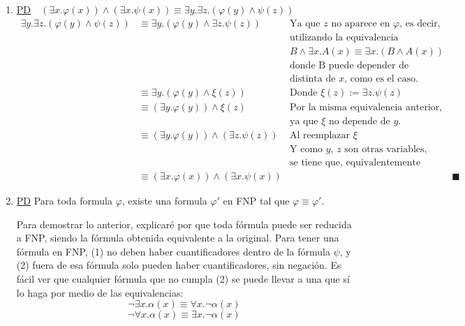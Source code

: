 \documentclass[letter]{article}
\begin{document}
	\begin{pregunta}{2}
		\begin{enumerate}
		\item
			\underline{PD}\ \ $(\exists x. \varphi(x)) \wedge (\exists x. \psi(x)) \equiv \exists y. \exists z. (\varphi(y) \wedge \psi(z))$
			\begin{align*}
				\exists y. \exists z. (\varphi(y) \wedge \psi(z))
				&\equiv \exists y. (\varphi(y) \wedge \exists z. \psi(z))
				&\text{Ya que $z$ no aparece en $\varphi$, es decir,}\\
				&&\text{utilizando la equivalencia}\\
				&&\text{$B\wedge \exists x. A(x) \equiv \exists x. (B \wedge A(x))$}\\
				&&\text{donde B puede depender de cualquier variable}\\
				&&\text{distinta de $x$, como es el caso.}\\
				&\equiv \exists y. (\varphi(y) \wedge \xi(z))
				&\text{Donde $\xi(z):=\exists z. \psi(z)$}\\
				&\equiv (\exists y. \varphi(y)) \wedge \xi(z)
				&\text{Por la misma equivalencia anterior,}\\
				&&\text{ya que $\xi$ no depende de $y$.}\\
				&\equiv (\exists y. \varphi(y)) \wedge (\exists z. \psi(z))
				&\text{Al reemplazar $\xi$}\\
				&&\text{Y como $y$, $z$ son otras variables,}\\
				&&\text{se tiene que, equivalentemente}\\
				&\equiv (\exists x. \varphi(x)) \wedge (\exists x. \psi(x))
				&&\blacksquare
			\end{align*}

		\item
		
			\underline{PD} Para toda formula $\varphi$, existe una formula $\varphi '$ en FNP tal que $\varphi\equiv\varphi'$.
			
			Para demostrar lo anterior, explicaré por que toda fórmula puede ser reducida a FNP, siendo la fórmula obtenida equivalente a la original. Para tener una fórmula en FNP, (1) no deben haber cuantificadores dentro de la fórmula $\psi$, y (2) fuera de esa fórmula solo pueden haber cuantificadores, sin negación. Es fácil ver que cualquier fórmula que no cumpla (2) se puede llevar a una que sí lo haga por medio de las equivalencias: 	$$\neg\exists x. \alpha(x) \equiv \forall x. \neg\alpha(x) $$
				$$\neg\forall x. \alpha(x) \equiv \exists x. \neg\alpha(x)$$
				

\end{enumerate}
\end{pregunta}
\end{document}
